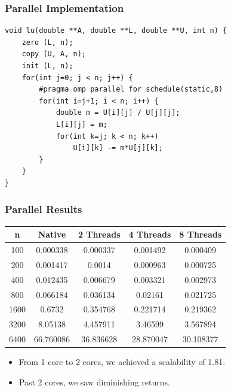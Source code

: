 \documentclass{beamer}
\begin{document}
\begin{frame}[fragile]
\frametitle{Parallel Implementation}

\begin{lstlisting}
void lu(double **A, double **L, double **U, int n) {
    zero (L, n);
    copy (U, A, n);
    init (L, n);
    for(int j=0; j < n; j++) {
        #pragma omp parallel for schedule(static,8)  
        for(int i=j+1; i < n; i++) {
            double m = U[i][j] / U[j][j];
            L[i][j] = m;
            for(int k=j; k < n; k++)
                U[i][k] -= m*U[j][k];
        }
    }
}
\end{lstlisting}

\end{frame}

\begin{frame}[fragile]
\frametitle{Parallel Results}

\begin{center}
\begin{tabular}{|c|c|c|c|c|}
\hline
n & Native & 2 Threads & 4 Threads & 8 Threads\\
\hline
100	& 0.000338 & 	0.000337 & 0.001492	& 0.000409 \\
200	& 0.001417 & 	0.0014 & 0.000963 &	0.000725 \\
400	& 0.012435 & 0.006679 & 0.003321 & 0.002973 \\
800	& 0.066184 & 0.036134 & 0.02161 & 0.021725 \\
1600 & 0.6732 &	0.354768 & 0.221714 & 0.219362 \\
3200 & 8.05138 & 4.457911 & 3.46599 & 3.567894 \\
6400 & 66.760086 & 36.836628 & 28.870047 & 30.108377 \\
\hline
\end{tabular}
\end{center}

\begin{itemize}
\setlength\itemsep{0.25em}
\item From 1 core to 2 cores, we achieved a scalability of 1.81. 
\item Past 2 cores, we saw diminishing returns.  
\end{itemize}

\end{frame}
\end{document}
